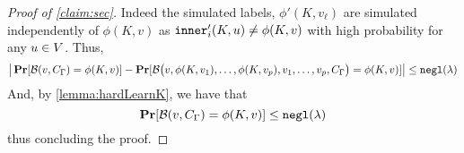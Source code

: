\begin{proof}[Proof of \cref{claim:sec}]
Indeed the simulated labels, $\phi'(K, v_\ell)$ are simulated independently of $\phi(K, v)$ as $\texttt{inner}_i'(K, u) \neq \phi(K, v)$
with high probability for any $u \in V$.
Thus, 
\begin{equation*}
	\big|
		\operatorname*{\mathbf{Pr}}[\mathcal{B}(v, C_\Gamma) = \phi(K, v)] - \operatorname*{\mathbf{Pr}}[\mathcal{B}\big(v, \phi(K, v_1), \dots, \phi(K, v_p), v_1, \dots, v_p, C_\Gamma\big) = \phi(K, v)]
	\big| \leq \texttt{negl}(\lambda)
\end{equation*}
And, by \cref{lemma:hardLearnK}, we have that
\begin{equation*}
	\operatorname*{\mathbf{Pr}}[\mathcal{B}(v, C_\Gamma) = \phi(K, v)] \leq \texttt{negl}(\lambda)
\end{equation*}
thus concluding the proof.
\end{proof}



